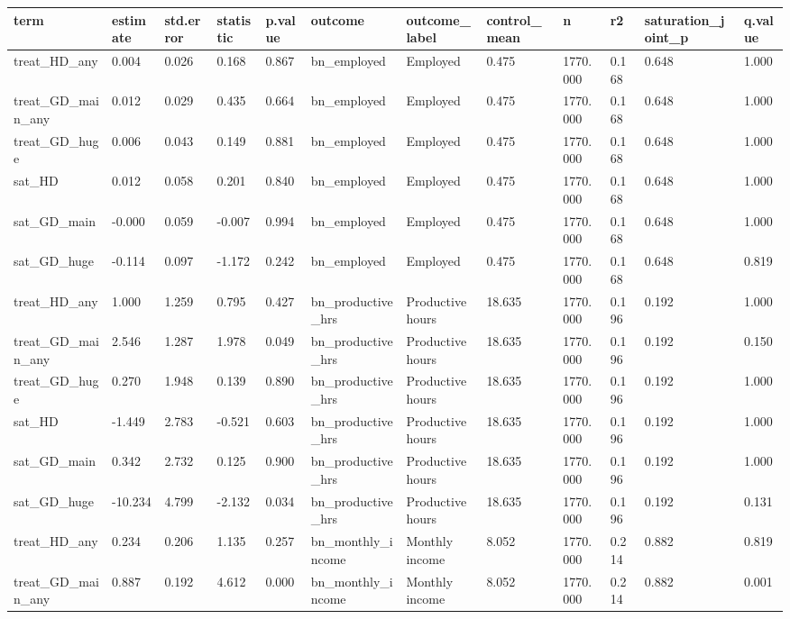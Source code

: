 \begin{tabular}{llllllllllll}
\toprule
term & estimate & std.error & statistic & p.value & outcome & outcome\_label & control\_mean & n & r2 & saturation\_joint\_p & q.value
 \\
\midrule
treat\_HD\_any & 0.004 & 0.026 & 0.168 & 0.867 & bn\_employed & Employed & 0.475 & 1770.000 & 0.168 & 0.648 & 1.000 \\
treat\_GD\_main\_any & 0.012 & 0.029 & 0.435 & 0.664 & bn\_employed & Employed & 0.475 & 1770.000 & 0.168 & 0.648 & 1.000 \\
treat\_GD\_huge & 0.006 & 0.043 & 0.149 & 0.881 & bn\_employed & Employed & 0.475 & 1770.000 & 0.168 & 0.648 & 1.000 \\
sat\_HD & 0.012 & 0.058 & 0.201 & 0.840 & bn\_employed & Employed & 0.475 & 1770.000 & 0.168 & 0.648 & 1.000 \\
sat\_GD\_main & -0.000 & 0.059 & -0.007 & 0.994 & bn\_employed & Employed & 0.475 & 1770.000 & 0.168 & 0.648 & 1.000 \\
sat\_GD\_huge & -0.114 & 0.097 & -1.172 & 0.242 & bn\_employed & Employed & 0.475 & 1770.000 & 0.168 & 0.648 & 0.819 \\
treat\_HD\_any & 1.000 & 1.259 & 0.795 & 0.427 & bn\_productive\_hrs & Productive hours & 18.635 & 1770.000 & 0.196 & 0.192 & 1.000 \\
treat\_GD\_main\_any & 2.546 & 1.287 & 1.978 & 0.049 & bn\_productive\_hrs & Productive hours & 18.635 & 1770.000 & 0.196 & 0.192 & 0.150 \\
treat\_GD\_huge & 0.270 & 1.948 & 0.139 & 0.890 & bn\_productive\_hrs & Productive hours & 18.635 & 1770.000 & 0.196 & 0.192 & 1.000 \\
sat\_HD & -1.449 & 2.783 & -0.521 & 0.603 & bn\_productive\_hrs & Productive hours & 18.635 & 1770.000 & 0.196 & 0.192 & 1.000 \\
sat\_GD\_main & 0.342 & 2.732 & 0.125 & 0.900 & bn\_productive\_hrs & Productive hours & 18.635 & 1770.000 & 0.196 & 0.192 & 1.000 \\
sat\_GD\_huge & -10.234 & 4.799 & -2.132 & 0.034 & bn\_productive\_hrs & Productive hours & 18.635 & 1770.000 & 0.196 & 0.192 & 0.131 \\
treat\_HD\_any & 0.234 & 0.206 & 1.135 & 0.257 & bn\_monthly\_income & Monthly income & 8.052 & 1770.000 & 0.214 & 0.882 & 0.819 \\
treat\_GD\_main\_any & 0.887 & 0.192 & 4.612 & 0.000 & bn\_monthly\_income & Monthly income & 8.052 & 1770.000 & 0.214 & 0.882 & 0.001 \\

\end{tabular}
